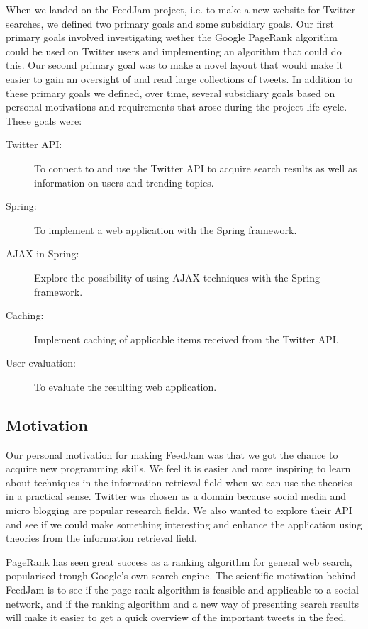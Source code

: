 When we landed on the FeedJam project, i.e. to make a new website for Twitter searches, we defined two primary goals and some subsidiary goals. Our first primary goals involved investigating wether the Google PageRank algorithm could be used on Twitter users and implementing an algorithm that could do this. Our second primary goal was to make a novel layout that would make it easier to gain an oversight of and read large collections of tweets. In addition to these primary goals we defined, over time, several subsidiary goals based on personal motivations and requirements that arose during the project life cycle. These goals were:

\begin{description}
  \item[Twitter API:] To connect to and use the Twitter API to acquire search results as well as information on users and trending topics.
  \item[Spring:] To implement a web application with the Spring framework.
  \item[AJAX in Spring:] Explore the possibility of using AJAX techniques with the Spring framework.
  \item[Caching:] Implement caching of applicable items received from the Twitter API.
  \item[User evaluation:] To evaluate the resulting web application.
\end{description}

\subsection{Motivation} %
Our personal motivation for making FeedJam was that we got the chance to acquire new programming skills. We feel it is easier and more inspiring to learn about techniques in the information retrieval field when we can use the theories in a practical sense. Twitter was chosen as a domain because social media and micro blogging are popular research fields. We also wanted to explore their API and see if we could make something interesting and enhance the application using theories from the information retrieval field.

PageRank has seen great success as a ranking algorithm for general web search, popularised trough Google's own search engine. The scientific motivation behind FeedJam is to see if the page rank algorithm is feasible and applicable to a social network, and if the ranking algorithm and a new way of presenting search results will make it easier to get a quick overview of the important tweets in the feed.
